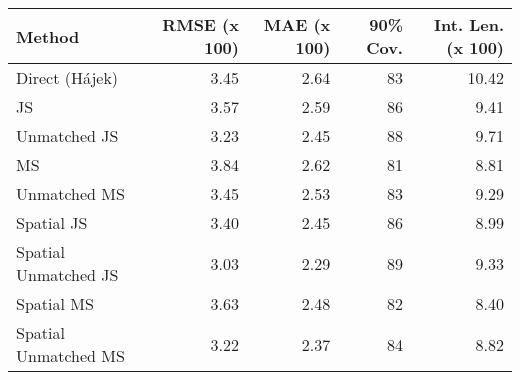 
\begin{tabular}{lrrrr}
\toprule
Method & RMSE (x 100) & MAE (x 100) & 90\% Cov. & Int. Len. (x 100)\\
\midrule
Direct (Hájek) & 3.45 & 2.64 & 83 & 10.42\\
JS & 3.57 & 2.59 & 86 & 9.41\\
Unmatched JS & 3.23 & 2.45 & 88 & 9.71\\
MS & 3.84 & 2.62 & 81 & 8.81\\
Unmatched MS & 3.45 & 2.53 & 83 & 9.29\\
Spatial JS & 3.40 & 2.45 & 86 & 8.99\\
Spatial Unmatched JS & 3.03 & 2.29 & 89 & 9.33\\
Spatial MS & 3.63 & 2.48 & 82 & 8.40\\
Spatial Unmatched MS & 3.22 & 2.37 & 84 & 8.82\\
\bottomrule
\end{tabular}
